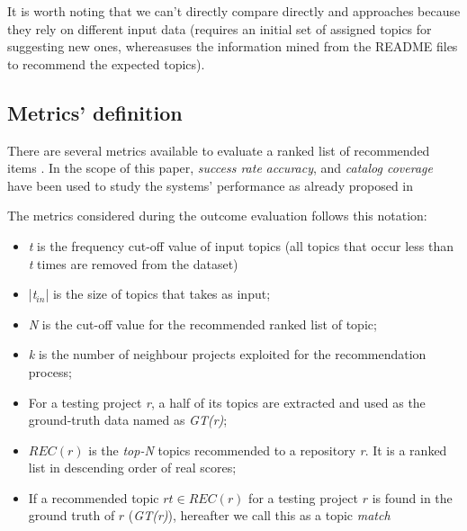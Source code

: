 It is worth noting that we can't directly compare directly \CT and \MNB approaches because they rely on different input data (\ie \CT requires an initial set of assigned topics for suggesting new ones, whereas\MNB uses the information mined from the README files to recommend the expected topics). 


\subsection{Metrics' definition}\label{sec:metrics}


There are several metrics available to evaluate a ranked list of recommended items \cite{DBLP:conf/rweb/NoiaO15}. In the scope of this paper, \emph{success rate} \emph{accuracy}, and \emph{catalog coverage} have been used to study the systems' performance as already proposed in \etal~\cite{Robillard:2014:RSS:2631387}



 The metrics considered during the outcome evaluation follows this notation:

\begin{itemize}[noitemsep,topsep=0pt]
	\item \emph{t} is the frequency cut-off value of input topics (\ie all topics that occur less than \emph{t} times are removed from the dataset)
	\item |\emph{t$_{in}$}| is the size of topics that \CT takes as input;
	\item \emph{N} is the cut-off value for the recommended ranked list of topic;%
	\item \emph{k} is the number of neighbour projects exploited for the recommendation process;
	\item For a testing project \emph{r}, a half of its topics are extracted and used as the ground-truth data named as \emph{GT(r)};
	\item $REC(r)$ is the \emph{top-N} topics recommended to a repository \emph{r}. It is a ranked list in descending order of real scores;
	\item If a recommended topic $rt \in REC(r)$ for a testing project $r$ is found in the ground truth of $r$ (\ie \emph{GT(r)}), hereafter we call this as a topic \textit{match}
\end{itemize}



